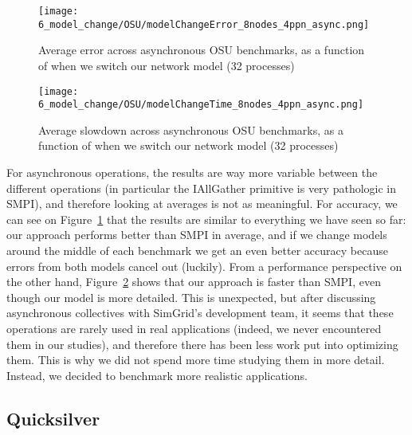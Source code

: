 \begin{figure}[!h]
    \centering
    \texttt{[image: 6\_model\_change/OSU/modelChangeError\_8nodes\_4ppn\_async.png]}
    \caption{Average error across asynchronous OSU benchmarks, as a function of when we switch our network model (32 processes)}
    \label{fig:6_model_change:osu_32_async_error}
\end{figure}

\begin{figure}[!h]
    \centering
    \texttt{[image: 6\_model\_change/OSU/modelChangeTime\_8nodes\_4ppn\_async.png]}
    \caption{Average slowdown across asynchronous OSU benchmarks, as a function of when we switch our network model (32 processes)}
    \label{fig:6_model_change:osu_32_async_perf}
\end{figure}

For asynchronous operations, the results are way more variable between the
different operations (in particular the IAllGather primitive is very pathologic
in SMPI), and therefore looking at averages is not as meaningful. For accuracy,
we can see on Figure~\ref{fig:6_model_change:osu_32_async_error} that the
results are similar to everything we have seen so far: our approach performs
better than SMPI in average, and if we change models around the middle of each
benchmark we get an even better accuracy because errors from both models cancel
out (luckily). From a performance perspective on the other hand,
Figure~\ref{fig:6_model_change:osu_32_async_perf} shows that our approach is
faster than SMPI, even though our model is more detailed. This is unexpected,
but after discussing asynchronous collectives with SimGrid's development team,
it seems that these operations are rarely used in real applications (indeed, we
never encountered them in our studies), and therefore there has been less work
put into optimizing them. This is why we did not spend more time studying them
in more detail. Instead, we decided to benchmark more realistic applications.

\subsection{Quicksilver}

